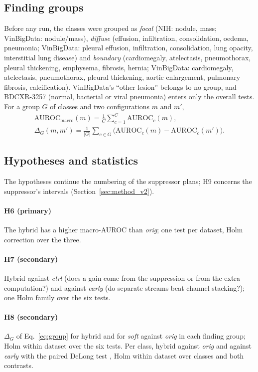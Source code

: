 \subsection{Finding groups}
Before any run, the classes were grouped as \emph{focal} (NIH: nodule, mass; VinBigData: nodule/mass), \emph{diffuse} (effusion,
infiltration, consolidation, oedema, pneumonia; VinBigData: pleural effusion, infiltration, consolidation, lung opacity, interstitial lung
disease) and \emph{boundary} (cardiomegaly, atelectasis, pneumothorax, pleural thickening, emphysema, fibrosis, hernia; VinBigData:
cardiomegaly, atelectasis, pneumothorax, pleural thickening, aortic enlargement, pulmonary fibrosis, calcification). VinBigData's
``other lesion'' belongs to no group, and BDCXR-3257 (normal, bacterial or viral pneumonia) enters only the overall tests. For a group $G$ of
classes and two configurations $m$ and $m'$,
\begin{equation}
\begin{gathered}
\mathrm{AUROC}_{\mathrm{macro}}(m)=\frac1C\sum_{c=1}^{C}\mathrm{AUROC}_c(m),\\
\Delta_G(m,m')=\frac{1}{|G|}\sum_{c\in G}\big(\mathrm{AUROC}_c(m)-\mathrm{AUROC}_c(m')\big).
\end{gathered}
\label{eq:group}
\end{equation}

\subsection{Hypotheses and statistics}
\label{sec:cls_stats}
The hypotheses continue the numbering of the suppressor plans; H9 concerns the suppressor's intervals (Section~\ref{sec:method_v2}).
\paragraph{H6 (primary)} The hybrid has a higher macro-AUROC than \emph{orig}; one test per dataset, Holm correction over the three.
\paragraph{H7 (secondary)} Hybrid against \emph{ctrl} (does a gain come from the suppression or from the extra computation?) and against
\emph{early} (do separate streams beat channel stacking?); one Holm family over the six tests.
\paragraph{H8 (secondary)} $\Delta_G$ of Eq.~\eqref{eq:group} for hybrid and for \emph{soft} against \emph{orig} in each finding group; Holm
within dataset over the six tests. Per class, hybrid against \emph{orig} and against \emph{early} with the paired DeLong test
\citep{delong1988auc}, Holm within dataset over classes and both contrasts.

